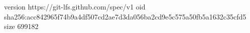 version https://git-lfs.github.com/spec/v1
oid sha256:acc842965f74b9a4df507cd2ae7d3da056ba2cd9e5c575a50fb5a1632c35cfd5
size 699182
